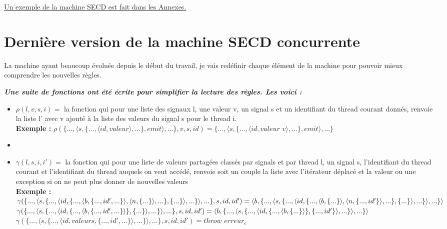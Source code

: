 \documentclass[10pt,a4paper]{article}
\begin{document}
					
					\hyperref[SECD]{Un exemple de la machine SECD est fait dans les Annexes.}
					
					\newpage
		\section{Dernière version de la machine SECD concurrente}\label{SECDConc4}
			La machine ayant beaucoup évoluée depuis le début du travail, je vais redéfinir chaque élément de la machine pour pouvoir mieux comprendre les nouvelles règles.
			\bigbreak
			
			\textbf{\textit{Une suite de fonctions ont été écrite pour simplifier la lecture des règles. Les voici :}}
			\smallbreak
			\begin{itemize}
				\item[] $\rho(l,v,s,i) =$ la fonction qui pour une liste des signaux l, une valeur v, un signal s et un identifiant du thread courant donnés, renvoie la liste l' avec v ajouté à la liste des valeurs du signal s pour le thread i.
				\\\textbf{Exemple :} $\rho(\{...,\langle s,\{...,\langle id,valeur\rangle,...\},emit\rangle,...\},v,s,id) = \{...,\langle s,\{...,\langle id,valeur$ $v\rangle,...\},emit\rangle,...\}$
				\item[] 
				\item[] $\gamma(l,s,i,i') =$ la fonction qui pour une liste de valeurs partagées classés par signals et par thread l, un signal s, l'identifiant du thread courant et l'identifiant du thread auquels on veut accédé, renvoie soit un couple la liste avec l'itérateur déplacé et la valeur ou une exception si on ne peut plus donner de nouvelles valeurs 
				\\\textbf{Exemple :}
				\\$\gamma(\{...,\langle s,\{...,\langle id,\{...,\langle b,\{...,id',...\}\rangle,\langle n,\{...\}\rangle,...\},\{...\}\rangle,...\}\rangle,...\},s,id,id') = 
				\\\langle b , \{...,\langle s,\{...,\langle id,\{...,\langle b,\{...\}\rangle,\langle n,\{...,id'\}\rangle,...\},\{...\}\rangle,...\}\rangle,...\} \rangle$
				\medbreak
				$\gamma(\{...,\langle s,\{...,\langle id,\{...,\langle b,\{...,id',...\}\rangle\},\{...\}\rangle,...\}\rangle,...\},s,id,id') = 
				\\\langle b , \{...,\langle s,\{...,\langle id,\{...,\langle b,\{...\}\rangle\},\{...,id'\}\rangle,...\}\rangle,...\} \rangle$
				\medbreak
				$\gamma(\{...,\langle s,\{...,\langle id,valeurs,\{...,id',...\}\rangle,...\}\rangle,...\},s,id,id') = throw$ $erreur_{e}$

\end{itemize}
\end{document}
